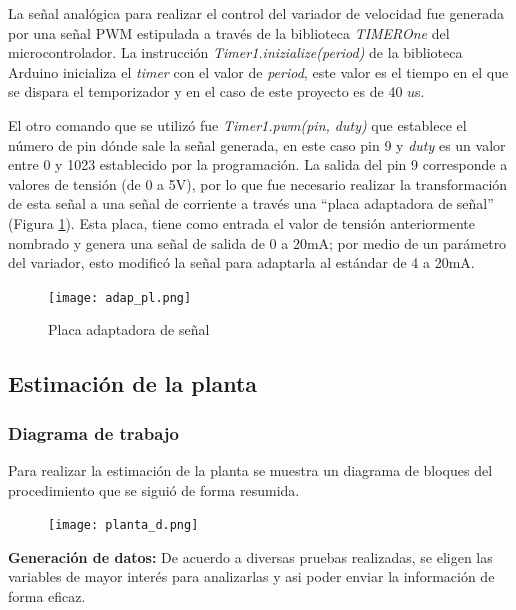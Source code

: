 La señal analógica para realizar el control del variador de velocidad fue generada por una señal PWM estipulada a través de la biblioteca \textit{TIMEROne} del microcontrolador. La instrucción \textit{Timer1.inizialize(period)} de la biblioteca Arduino inicializa el \textit{timer} con el valor de \textit{period}, este valor es el tiempo en el que se dispara el temporizador y en el caso de este proyecto es de 40 $u$s.

El otro comando que se utilizó fue \textit{Timer1.pwm(pin, duty)} que establece el número de
pin dónde sale la señal generada, en este caso pin 9 y \textit{duty} es un valor entre 0 y 1023 establecido por la programación. La salida del pin 9 corresponde a valores de tensión (de 0 a 5V), por lo que fue necesario realizar la transformación de esta señal a una señal de corriente a través una “placa adaptadora de señal” (Figura \ref{fig:adapt}). Esta placa, tiene como entrada el valor de tensión anteriormente nombrado y genera una señal de salida de 0 a 20mA; por medio de un parámetro del variador, esto modificó la señal para adaptarla al estándar de 4 a 20mA.

\begin{figure}[htbp]
	\centering
	\texttt{[image: adap\_pl.png]}
	\caption{Placa adaptadora de señal}
	\label{fig:adapt}
\end{figure}



\subsection{Estimación de la planta} \label{sec:estima}
    \subsubsection{Diagrama de trabajo}

Para realizar la estimación de la planta se muestra un diagrama de bloques del procedimiento que se siguió de forma resumida.

\begin{figure}[htb]
	\centering
	\texttt{[image: planta\_d.png]}
	\label{fig:planta_d}
\end{figure}

 \textbf{Generación de datos:} De acuerdo a diversas pruebas realizadas, se eligen las variables de mayor interés para analizarlas y asi poder enviar la información de forma eficaz.

